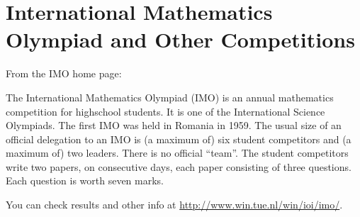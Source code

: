 \section{International Mathematics Olympiad and Other Competitions}

From the IMO home page:

The International Mathematics Olympiad (IMO) is an annual mathematics
competition for highschool students. It is one of the International
Science Olympiads. The first IMO was held in Romania in 1959. The usual
size of an official delegation to an IMO is (a maximum of) six student
competitors and (a maximum of) two leaders. There is no official
``team''. The student competitors write two papers, on consecutive days,
each paper consisting of three questions. Each question is worth seven
marks.

You can check results and other info at
\url{http://www.win.tue.nl/win/ioi/imo/}.
